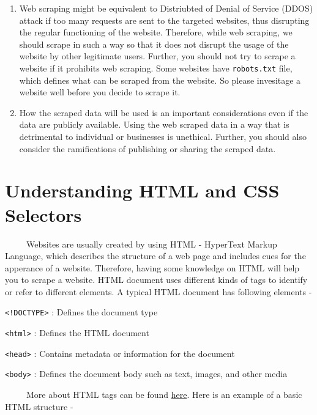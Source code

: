 \documentclass[
  letterpaper,
  DIV=11,
  numbers=noendperiod]{scrreprt}
\begin{document}
\begin{enumerate}
\def\labelenumi{\arabic{enumi}.}
\item
  Web scraping might be equivalent to Distriubted of Denial of Service
  (DDOS) attack if too many requests are sent to the targeted websites,
  thus disrupting the regular functioning of the website. Therefore,
  while web scraping, we should scrape in such a way so that it does not
  disrupt the usage of the website by other legitimate users. Further,
  you should not try to scrape a website if it prohibits web scraping.
  Some websites have \texttt{robots.txt} file, which defines what can be
  scraped from the website. So please invesitage a website well before
  you decide to scrape it.
\item
  How the scraped data will be used is an important considerations even
  if the data are publicly available. Using the web scraped data in a
  way that is detrimental to individual or businesses is unethical.
  Further, you should also consider the ramifications of publishing or
  sharing the scraped data.
\end{enumerate}

\section{Understanding HTML and CSS
Selectors}\label{understanding-html-and-css-selectors}

~~~~~Websites are usually created by using HTML - HyperText Markup
Language, which describes the structure of a web page and includes cues
for the apperance of a website. Therefore, having some knowledge on HTML
will help you to scrape a website. HTML document uses different kinds of
tags to identify or refer to different elements. A typical HTML document
has following elements -

\texttt{\textless{}!DOCTYPE\textgreater{}} : Defines the document type

\texttt{\textless{}html\textgreater{}} : Defines the HTML document

\texttt{\textless{}head\textgreater{}} : Contains metadata or
information for the document

\texttt{\textless{}body\textgreater{}} : Defines the document body such
as text, images, and other media

~~~~~More about HTML tags can be found
\href{https://www.w3schools.com/tags/ref_byfunc.asp}{here}. Here is an
example of a basic HTML structure -
\end{document}
